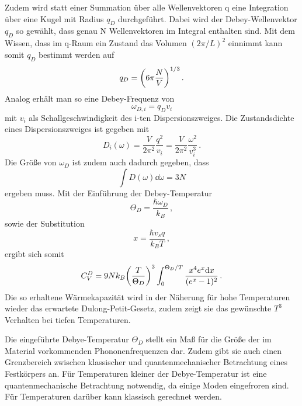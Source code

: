 Zudem wird statt einer Summation über alle Wellenvektoren q eine Integration über eine Kugel mit Radius $q_D$ durchgeführt. Dabei wird der Debey-Wellenvektor $q_D$ so gewählt, dass genau N Wellenvektoren im Integral enthalten sind.
Mit dem Wissen, dass im q-Raum  ein Zustand das Volumen $(2\pi/L)^2$ einnimmt kann somit $q_D$ bestimmt werden auf
\begin{equation}
	q_D = \qty(6\pi \frac{N}{V})^{1/3} \,.
	\label{eq:D-q}
\end{equation}
Analog erhält man so eine Debey-Frequenz von
\begin{equation}
	\omega_{D,i} = q_D v_i
	\label{eq:D-Freg}
\end{equation}
mit $v_i$ als Schallgeschwindigkeit des i-ten Dispersionszweiges. 
Die Zustandsdichte eines Dispersionszweiges ist gegeben mit
\begin{equation}
	D_i(\omega)= \frac{V}{2\pi^2}\frac{q^2}{v_i} =   \frac{V}{2\pi^2}\frac{\omega^2}{v_i^3} \,.
	\label{eq:D-Disp}
\end{equation}
Die Größe von $\omega_D$ ist zudem auch dadurch gegeben, dass
\begin{equation}
	\int D(\omega) \dd\omega = 3 N
	\label{eq:}
\end{equation}
ergeben muss.
Mit der Einführung der Debey-Temperatur
\begin{equation}
	\Theta_D = \frac{\hbar\omega_D}{k_B} \,,
	\label{eq:D-Temp}
\end{equation}
sowie der Substitution
\begin{equation}
	x=\frac{\hbar v_s q}{k_B T} \,,
\end{equation}
ergibt sich somit 
\begin{equation}
	C_V^D = 9Nk_B \qty(\frac{T}{\Theta_D})^3 \int_0^{\Theta_D/T} \frac{x^4e^x \dd x}{(e^x-1)^2} \,.
\end{equation}
Die so erhaltene Wärmekapazität wird in der Näherung für hohe Temperaturen wieder das erwartete Dulong-Petit-Gesetz, zudem zeigt sie das gewünschte $T^3$ Verhalten bei tiefen Temperaturen.

Die eingeführte Debye-Temperatur $\Theta_D$ stellt ein Maß für die Größe der im Material vorkommenden Phononenfrequenzen dar. Zudem gibt sie auch einen Grenzbereich zwischen klassischer und quantenmechanischer Betrachtung eines Festkörpers an. Für Temperaturen kleiner der Debye-Temperatur ist eine quantenmechanische Betrachtung notwendig, da einige Moden eingefroren sind. Für Temperaturen darüber kann klassisch gerechnet werden.